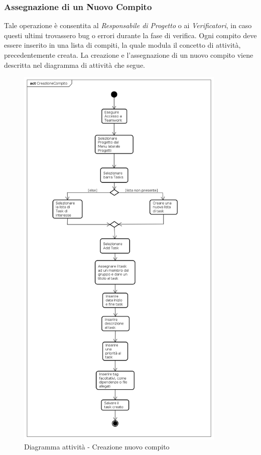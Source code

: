 \subsubsection{Assegnazione di un Nuovo Compito}

Tale operazione è consentita al \textit{Responsabile di Progetto} o ai \textit{Verificatori}, in caso questi ultimi trovassero bug o errori durante la fase di verifica. Ogni compito deve essere inserito in una lista di compiti, la quale modula il concetto di attività, precedentemente creata. La creazione e l'assegnazione di un nuovo compito viene descritta nel diagramma di attività che segue.

\begin{figure}[H]
\centering
\includegraphics[width=10cm]{CreazioneCompito.png}
\caption{Diagramma attività - Creazione nuovo compito}
\end{figure}

